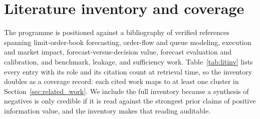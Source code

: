 \section{Literature inventory and coverage}
\label{app:literature}

The programme is positioned against a bibliography of verified references spanning
limit-order-book forecasting, order-flow and queue modeling, execution and market impact,
forecast-versus-decision value, forecast evaluation and calibration, and benchmark, leakage,
and sufficiency work. Table~\ref{tab:litinv} lists every entry with its role and its citation
count at retrieval time, so the inventory doubles as a coverage record: each cited work maps
to at least one cluster in Section~\ref{sec:related_work}. We include the full inventory
because a synthesis of negatives is only credible if it is read against the strongest prior
claims of positive information value, and the inventory makes that reading auditable.


